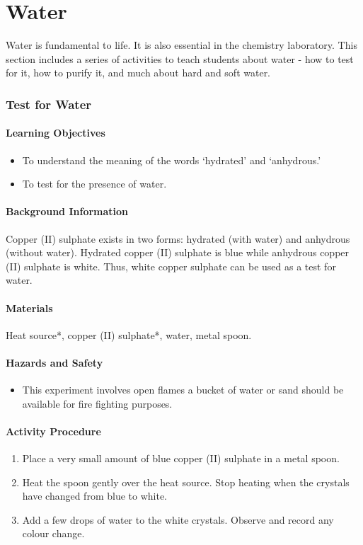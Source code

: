 \chapter{Water}

Water is fundamental to life. It is also essential in the chemistry laboratory. This section includes a series of activities to teach students about water - how to test for it, how to purify it, and much about hard and soft water.

\subsection{Test for Water}

\subsubsection*{Learning Objectives}
\begin{itemize}
\item{To understand the meaning of the words `hydrated' and `anhydrous.'}
\item{To test for the presence of water.}
\end{itemize}

\subsubsection*{Background Information}
Copper (II) sulphate exists in two forms: hydrated (with water) and anhydrous (without water). Hydrated copper (II) sulphate is blue while anhydrous copper (II) sulphate is white. Thus, white copper sulphate can be used as a test for water.

\subsubsection*{Materials}
Heat source*, copper (II) sulphate*, water, metal spoon.

\subsubsection*{Hazards and Safety}
\begin{itemize}
\item{This experiment involves open flames a bucket of water or sand should be available for fire fighting purposes.}
\end{itemize}

\subsubsection*{Activity Procedure}
\begin{enumerate}
\item{Place a very small amount of blue copper (II) sulphate in a metal spoon.}
\item{Heat the spoon gently over the heat source. Stop heating when the crystals have changed from blue to white.}
\item{Add a few drops of water to the white crystals. Observe and record any colour change.}
\end{enumerate}

